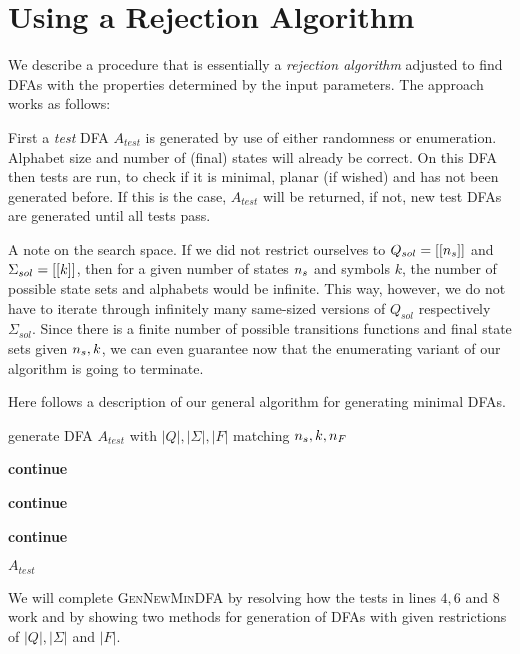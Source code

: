 \section{Using a Rejection Algorithm}

We describe a procedure that is essentially a \emph{rejection algorithm} adjusted to find DFAs with the properties determined by the input parameters. The approach works as follows:

First a \emph{test} DFA $A_{test}$ is generated by use of either randomness or enumeration. Alphabet size and number of (final) states will already be correct. On this DFA then tests are run, to check if it is minimal, planar (if wished) and has not been generated before. If this is the case, $A_{test}$ will be returned, if not, new test DFAs are generated until all tests pass.

A note on the search space. If we did not restrict ourselves to $Q_{sol} = [[{n_s}]]$ and $\Sigma_{sol} = [[k]]$, then for a given number of states ${n_s}$ and symbols $k$, the number of possible state sets and alphabets would be infinite. This way, however, we do not have to iterate through infinitely many same-sized versions of $Q_{sol}$ respectively $\Sigma_{sol}$. Since there is a finite number of possible transitions functions and final state sets given ${n_s}, k$, we can even guarantee now that the enumerating variant of our algorithm is going to terminate.

Here follows a description of our general algorithm for generating minimal DFAs.
\vspace{0.2cm}
\begin{algorithmic}[1]
		
			\vspace{0.2cm}
		
			\State generate DFA $A_{test}$ with $|Q|, |\Sigma|, |F|$ matching ${n_s}, k, {n_F}$
			
			\vspace{0.2cm}
			
				\State \textbf{continue}
			\EndIf
			
				\State \textbf{continue}
			\EndIf
			
				\State \textbf{continue}
			\EndIf
			
			\vspace{0.2cm}
			
			\State\Return $A_{test}$
		\EndWhile
	\EndFunction
\end{algorithmic}
\vspace{0.2cm}
We will complete \textsc{GenNewMinDFA} by resolving how the tests in lines $4, 6$ and $8$ work and by showing two methods for generation of DFAs with given restrictions of $|Q|, |\Sigma|$ and $|F|$.

